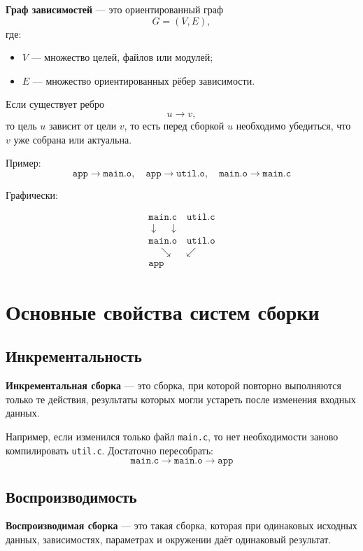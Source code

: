 \documentclass[12pt,a4paper]{article}
\begin{document}
\textbf{Граф зависимостей} --- это ориентированный граф
\[
G = (V, E),
\]
где:
\begin{itemize}
    \item $V$ --- множество целей, файлов или модулей;
    \item $E$ --- множество ориентированных рёбер зависимости.
\end{itemize}

Если существует ребро
\[
u \rightarrow v,
\]
то цель $u$ зависит от цели $v$, то есть перед сборкой $u$ необходимо убедиться, что $v$ уже собрана или актуальна.

Пример:
\[
\texttt{app} \rightarrow \texttt{main.o}, \quad
\texttt{app} \rightarrow \texttt{util.o}, \quad
\texttt{main.o} \rightarrow \texttt{main.c}
\]

Графически:

\[
\begin{array}{c}
\texttt{main.c} \quad \texttt{util.c} \\
\downarrow \quad \downarrow \\
\texttt{main.o} \quad \texttt{util.o} \\
\quad \searrow \quad \swarrow \\
\texttt{app}
\end{array}
\]

\section{Основные свойства систем сборки}

\subsection{Инкрементальность}

\textbf{Инкрементальная сборка} --- это сборка, при которой повторно выполняются только те действия, результаты которых могли устареть после изменения входных данных.

Например, если изменился только файл \texttt{main.c}, то нет необходимости заново компилировать \texttt{util.c}. Достаточно пересобрать:
\[
\texttt{main.c} \rightarrow \texttt{main.o} \rightarrow \texttt{app}
\]

\subsection{Воспроизводимость}

\textbf{Воспроизводимая сборка} --- это такая сборка, которая при одинаковых исходных данных, зависимостях, параметрах и окружении даёт одинаковый результат.
\end{document}
